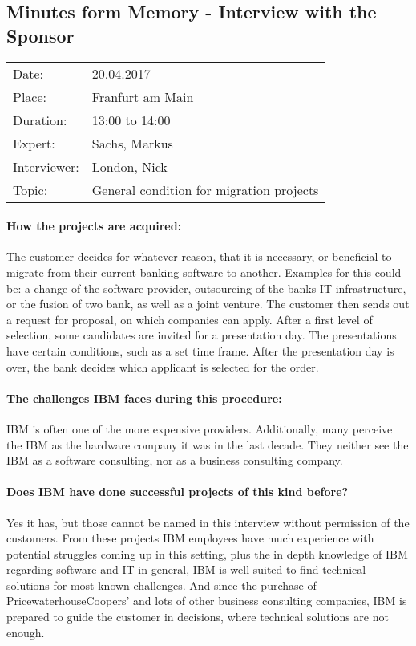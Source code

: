 \subsection*{Minutes form Memory  - Interview with the Sponsor}
\begin{tabular}{l l}
Date: & 20.04.2017 \\
Place: & Franfurt am Main \\
Duration: & 13:00 to 14:00 \\
Expert: & Sachs, Markus \\
Interviewer: & London, Nick \\
Topic: & General condition for migration projects
\end{tabular}

\paragraph{How the projects are acquired:}
The customer decides for whatever reason, that it is necessary, or beneficial to migrate from their current banking software to another. Examples for this could be: a change of the software provider, outsourcing of the banks IT infrastructure, or the fusion of two bank, as well as a joint venture. The customer then sends out a request for proposal, on which companies can apply. After a first level of selection, some candidates are invited for a presentation day. The presentations have certain conditions, such as a set time frame. After the presentation day is over, the bank decides which applicant is selected for the order.
\paragraph{The challenges IBM faces during this procedure:}
IBM is often one of the more expensive providers. Additionally, many perceive the IBM as the hardware company it was in the last decade. They neither see the IBM as a software consulting, nor as a business consulting company.
\paragraph{Does IBM have done successful projects of this kind before?} Yes it has, but those cannot be named in this interview without permission of the customers. From these projects IBM employees have much experience with potential struggles coming up in this setting, plus the in depth knowledge of IBM regarding software and IT in general, IBM is well suited to find technical solutions for most known challenges. And since the purchase of PricewaterhouseCoopers' and lots of other business consulting companies, IBM is prepared to guide the customer in decisions, where technical solutions are not enough.